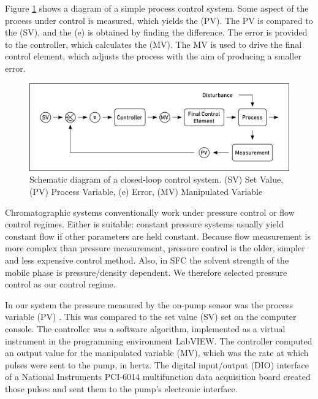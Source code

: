 Figure \ref{fig:processcontrol} shows a diagram of a simple process control
system. Some aspect of the process under control is measured, which yields the
 (PV). The PV is compared to the 
(SV), and the  (e) is obtained by finding the difference. The error
is provided to the controller, which calculates the  (MV). The MV is used to drive the final control element, which adjusts
the process with the aim of producing a smaller error.

\begin{figure}
\centering
\includegraphics[width=\textwidth]{Figures/ProcessControl.pdf}
\decoRule

\caption[A process control system]{Schematic diagram of a closed-loop control
system. (SV) Set Value, (PV) Process Variable, (e) Error, (MV) Manipulated
Variable}

\label{fig:processcontrol}
\end{figure}

Chromatographic systems conventionally work under pressure control or flow
control regimes. Either is suitable: constant pressure systems usually yield
constant flow if other parameters are held constant. Because flow measurement is
more complex than pressure measurement, pressure control is the older, simpler
and less expensive control method. Also, in SFC the solvent strength of the mobile
phase is pressure/density dependent. We therefore selected pressure control
as our control regime.

In our system the pressure measured by the on-pump sensor was the process
variable (PV) . This was compared to the set value (SV) set on the computer
console. The controller was a software algorithm, implemented as a virtual
instrument in the programming environment LabVIEW. The controller computed an
output value for the manipulated variable (MV), which was the rate at which
pulses were sent to the pump, in hertz. The digital input/output (DIO) interface
of a National Instruments PCI-6014 multifunction data acquisition board created
those pulses and sent them to the pump's electronic interface.

